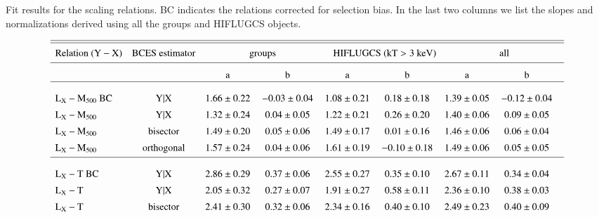 \documentclass{aa} %
\begin{document}
\begin{table*}[ht]
\caption{Fit results for the scaling relations. BC indicates the relations corrected for selection bias. In the last two columns we list the slopes and normalizations derived using all the groups and HIFLUGCS objects.}
\vspace{-10pt}
$$
\centering
\setlength\extrarowheight{2pt}
\begin{array}{lcc@{\hspace{1.2em}}c@{\hspace{1.2em}}c@{\hspace{1.2em}}c@{\hspace{1.2em}}c@{\hspace{1.2em}}c@{\hspace{1.2em}}}
\hline\hline
\noalign{\smallskip}
{\rm Relation \ (Y-X)} & {\rm BCES \ estimator} & \multicolumn{2}{c}{ {\rm groups}} & \multicolumn{2}{c}{ {\rm HIFLUGCS \ (kT>3 \ keV)}} & \multicolumn{2}{c}{ {\rm all}} \\
\noalign{\smallskip}
\hline \\ [-2.0ex]
\multicolumn{2}{c}{} & {\rm a} & {\rm b} & {\rm a} & {\rm b} & {\rm a} & {\rm b} \\
\hline \\ [-1.0ex]
{\rm L_{\text{X}}-M_{\text{500}} \ BC} & {\rm Y|X} & 1.66\pm0.22 & -0.03\pm0.04 & 1.08\pm0.21 & 0.18\pm0.18 & 1.39\pm0.05 & -0.12\pm0.04 \\[0.1cm]   
{\rm L_{\text{X}}-M_{\text{500}}} & {\rm Y|X} & 1.32\pm0.24 &  0.04\pm0.05 & 1.22\pm0.21 &  0.26\pm0.20 & 1.40\pm0.06 &  0.09\pm0.05  \\[0.1cm]  
{\rm L_{\text{X}}-M_{\text{500}}} & {\rm bisector} & 1.49\pm0.20 &  0.05\pm0.06 & 1.49\pm0.17 &  0.01\pm0.16 & 1.46\pm0.06 &  0.06\pm0.04  \\[0.1cm] 			
{\rm L_{\text{X}}-M_{\text{500}}} & {\rm orthogonal} & 1.57\pm0.24 &  0.04\pm0.06 & 1.61\pm0.19 & -0.10\pm0.18 & 1.49\pm0.06 &  0.05\pm0.05  \\[0.1cm] 
\hline \\ [-1.0ex]
{\rm L_{\text{X}}-T \ BC} & {\rm Y|X} & 2.86\pm0.29 &  0.37\pm0.06 & 2.55\pm0.27 &  0.35\pm0.10 & 2.67\pm0.11 &  0.34\pm0.04 \\[0.1cm]  
{\rm L_{\text{X}}-T }     & {\rm Y|X} & 2.05\pm0.32 &  0.27\pm0.07 & 1.91\pm0.27 &  0.58\pm0.11 & 2.36\pm0.10 &  0.38\pm0.03 \\[0.1cm] 
{\rm L_{\text{X}}-T }     & {\rm bisector} & 2.41\pm0.30 &  0.32\pm0.06 & 2.34\pm0.16 &  0.40\pm0.10 & 2.49\pm0.23 &  0.40\pm0.09 \\[0.1cm]   

\end{array}$$
\end{table*}
\end{document}
